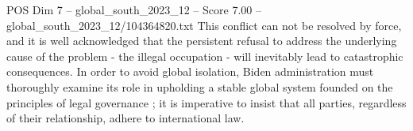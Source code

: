 \begin{textsample}{POS Dim 7 – global\_south\_2023\_12 – Score 7.00 – global\_south\_2023\_12/104364820.txt}
This conflict can not be resolved by force, and it is well acknowledged that the persistent refusal to address the underlying cause of the problem - the illegal occupation - will inevitably lead to catastrophic consequences.
In order to avoid global isolation, Biden administration must thoroughly examine its role in upholding a stable global system founded on the principles of legal governance ; it is imperative to insist that all parties, regardless of their relationship, adhere to international law.

\end{textsample}
